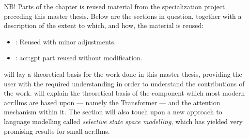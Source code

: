 \begin{itshape}
    NB! Parts of the  chapter is reused material from the specialization project \citep{holmLLMsDeathGIS2023} preceding this master thesis. Below are the sections in question, together with a description of the extent to which, and how, the material is reused:

    \begin{itemize}
        \item {}: Reused with minor adjustments.
        \item {}: \acrshort{acr:gpt} part reused without modification.
    \end{itemize}
\end{itshape}

\vspace{12pt}

\noindent {} will lay a theoretical basis for the work done in this master thesis, providing the user with the required understanding in order to understand the contributions of the work.  will explain the theoretical basis of the component which most modern \glspl{acr:llm} are based upon --- namely the Transformer --- and the attention mechanism within it. The section will also touch upon a new approach to language modelling called \textit{selective state space modelling}, which has yielded very promising results for small \glspl{acr:llm}.





